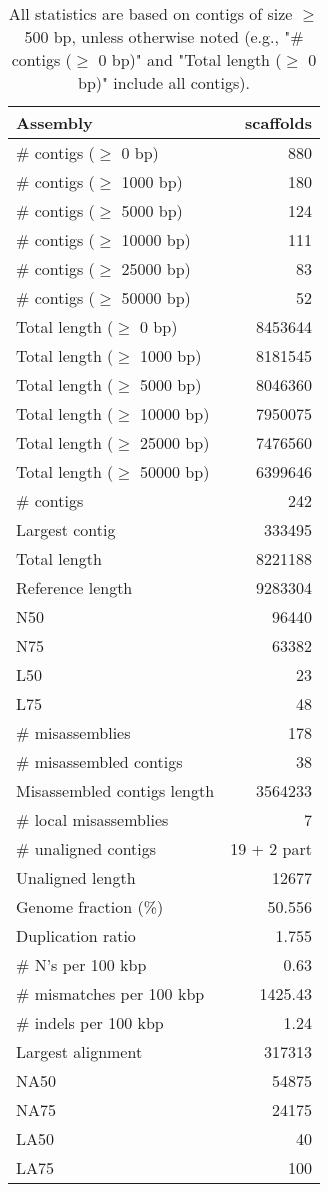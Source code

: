 \documentclass[12pt,a4paper]{article}
\begin{document}
\begin{table}[ht]
\begin{center}
\caption{All statistics are based on contigs of size $\geq$ 500 bp, unless otherwise noted (e.g., "\# contigs ($\geq$ 0 bp)" and "Total length ($\geq$ 0 bp)" include all contigs).}
\begin{tabular}{|l*{1}{|r}|}
\hline
Assembly & scaffolds \\ \hline
\# contigs ($\geq$ 0 bp) & 880 \\ \hline
\# contigs ($\geq$ 1000 bp) & 180 \\ \hline
\# contigs ($\geq$ 5000 bp) & 124 \\ \hline
\# contigs ($\geq$ 10000 bp) & 111 \\ \hline
\# contigs ($\geq$ 25000 bp) & 83 \\ \hline
\# contigs ($\geq$ 50000 bp) & 52 \\ \hline
Total length ($\geq$ 0 bp) & 8453644 \\ \hline
Total length ($\geq$ 1000 bp) & 8181545 \\ \hline
Total length ($\geq$ 5000 bp) & 8046360 \\ \hline
Total length ($\geq$ 10000 bp) & 7950075 \\ \hline
Total length ($\geq$ 25000 bp) & 7476560 \\ \hline
Total length ($\geq$ 50000 bp) & 6399646 \\ \hline
\# contigs & 242 \\ \hline
Largest contig & 333495 \\ \hline
Total length & 8221188 \\ \hline
Reference length & 9283304 \\ \hline
N50 & 96440 \\ \hline
N75 & 63382 \\ \hline
L50 & 23 \\ \hline
L75 & 48 \\ \hline
\# misassemblies & 178 \\ \hline
\# misassembled contigs & 38 \\ \hline
Misassembled contigs length & 3564233 \\ \hline
\# local misassemblies & 7 \\ \hline
\# unaligned contigs & 19 + 2 part \\ \hline
Unaligned length & 12677 \\ \hline
Genome fraction (\%) & 50.556 \\ \hline
Duplication ratio & 1.755 \\ \hline
\# N's per 100 kbp & 0.63 \\ \hline
\# mismatches per 100 kbp & 1425.43 \\ \hline
\# indels per 100 kbp & 1.24 \\ \hline
Largest alignment & 317313 \\ \hline
NA50 & 54875 \\ \hline
NA75 & 24175 \\ \hline
LA50 & 40 \\ \hline
LA75 & 100 \\ \hline
\end{tabular}
\end{center}
\end{table}
\end{document}
